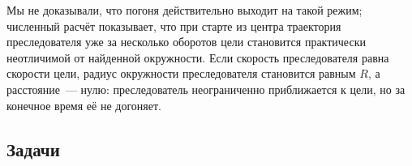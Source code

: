 \documentclass[../main.tex]{subfiles}
\begin{document}
Мы не доказывали, что погоня действительно выходит на такой режим; численный расчёт
показывает, что при старте из центра траектория преследователя уже за несколько
оборотов цели становится практически неотличимой от найденной окружности. Если
скорость преследователя равна скорости цели, радиус окружности преследователя
становится равным $R$, а расстояние~--- нулю: преследователь неограниченно
приближается к цели, но за конечное время её не догоняет.

\subsection{Задачи}
\end{document}
